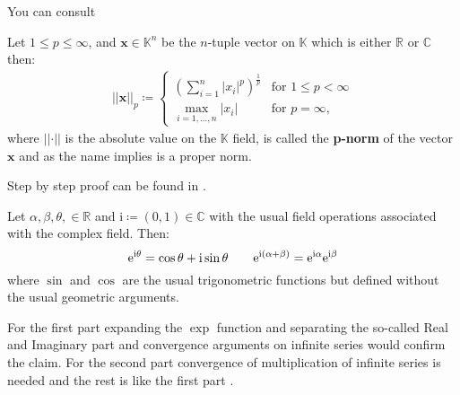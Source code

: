 \begin{Proof}
    You can consult \cite{Frazier1999}\cite{Horn2012}\cite{Hackbusch2019}
\end{Proof}
\begin{Def}\label{def:p-norm}
    Let $1 \leq p \leq \infty$, and $\boldsymbol{x} \in \mathbb{K}^n$ be the $n$-tuple vector on $\mathbb{K}$ which is either $\mathbb{R}$ or $\mathbb{C}$ then:
    \begin{equation*}
        \begin{split} 
            \left|\left|\boldsymbol{x}\right|\right|_p \coloneqq    
            \begin{cases}
                \left(\sum_{i=1}^{n}\left|x_i\right|^p\right)^{\frac{1}{p}} & \text{for } 1 \leq p < \infty\\
                \underset{{i=1,\dots,n}}{\max} \left|x_i\right| & \text{for } p = \infty,
            \end{cases}
        \end{split}
    \end{equation*}
    where $\left|\left|\boldsymbol{\cdot}\right|\right|$ is the absolute value on the $\mathbb{K}$ field,
    is called the \textbf{p-norm} of the vector $\boldsymbol{x}$ and as the name implies is a proper norm.
\end{Def}
\begin{Proof}
    Step by step proof can be found in \cite{Alt2016}.
\end{Proof}
\begin{Thm}\label{theorem:euler_formula}
    Let $\alpha,\beta,\theta, \in \mathbb{R}$ and $\mathrm{i} \coloneqq (0,1) \in \mathbb{C}$ with the usual field operations associated with the 
	complex field. Then:
	\begin{equation*}
		\mathrm{e}^{\mathrm{i}\theta} = \cos \theta +  \mathrm{i}\sin \theta \qquad  \mathrm{e}^{\mathrm{i}(\alpha+\beta)} = \mathrm{e}^{\mathrm{i}\alpha}\mathrm{e}^{\mathrm{i}\beta}\index{Euler formula}\index{Function!$\exp$}\index{Function!$\sin$}\index{Function!$\cos$}
	\end{equation*}
    where $\sin$ and $\cos$ are the usual trigonometric functions but defined without the usual geometric arguments.
	\end{Thm}
	\begin{Proof}
		For the first part expanding the $\exp$ function and separating the so-called Real and Imaginary part and convergence arguments 
	on infinite series would confirm the claim\cite{Rudin1976}\cite{Rudin1987}\cite{Stein2005}\cite{Stein2003}. For the second part 
	convergence of multiplication of infinite series is needed and the rest is like the first part \cite{Rudin1976}\cite{Rudin1987}\cite{Stein2005}\cite{Stein2003}. 
	\end{Proof}
